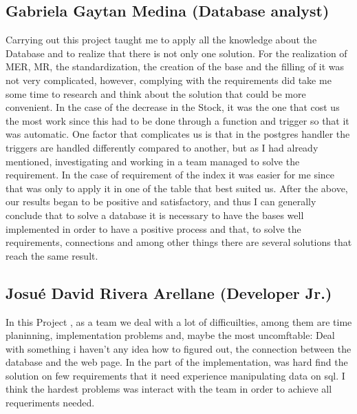 \documentclass{article}
\begin{document}
\subsection{Gabriela Gaytan Medina (Database analyst)}
Carrying out this project taught me to apply all the knowledge about the Database and to realize that there is not only one solution.
For the realization of MER, MR, the standardization, the creation of the base and the filling of it was not very complicated, however, complying with the requirements did take me some time to research and think about the solution that could be more convenient. In the case of the decrease in the Stock, it was the one that cost us the most work since this had to be done through a function and trigger so that it was automatic. One factor that complicates us is that in the postgres handler the triggers are handled differently compared to another, but as I had already mentioned, investigating and working in a team managed to solve the requirement.
In the case of requirement of the index it was easier for me since that was only to apply it in one of the table that best suited us.
After the above, our results began to be positive and satisfactory, and thus I can generally conclude that to solve a database it is necessary to have the bases well implemented in order to have a positive process and that, to solve the requirements, connections and among other things there are several solutions that reach the same result.
\subsection{Josué David Rivera Arellane (Developer Jr.)}
In this Project , as a team we deal with a lot of difficuilties, among them are time planinning, implementation problems and, maybe the most uncomftable: Deal with something i haven’t any idea how to  figured out, the connection between the database and the web page. In the part of the implementation, was hard find the solution on few requirements that it need experience manipulating data on sql. I think the hardest problems was interact with the team in order to achieve all requeriments needed.
\end{document}
